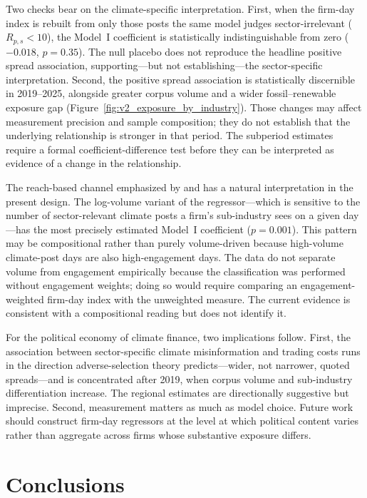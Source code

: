 \documentclass{article}
\theoremstyle{plain}
\begin{document}
Two checks bear on the climate-specific interpretation. First, when the firm-day index is rebuilt from only those posts the same model judges sector-irrelevant ($R_{p,s}<10$), the Model~I coefficient is statistically indistinguishable from zero ($-0.018$, $p=0.35$). The null placebo does not reproduce the headline positive spread association, supporting---but not establishing---the sector-specific interpretation. Second, the positive spread association is statistically discernible in 2019--2025, alongside greater corpus volume and a wider fossil--renewable exposure gap (Figure~\ref{fig:v2_exposure_by_industry}). Those changes may affect measurement precision and sample composition; they do not establish that the underlying relationship is stronger in that period. The subperiod estimates require a formal coefficient-difference test before they can be interpreted as evidence of a change in the relationship.

The reach-based channel emphasized by \textcite{acemoglu2010spread} and \textcite{VosoughiRoyAral2018} has a natural interpretation in the present design. The log-volume variant of the regressor---which is sensitive to the number of sector-relevant climate posts a firm's sub-industry sees on a given day---has the most precisely estimated Model~I coefficient ($p=0.001$). This pattern may be compositional rather than purely volume-driven because high-volume climate-post days are also high-engagement days. The data do not separate volume from engagement empirically because the classification was performed without engagement weights; doing so would require comparing an engagement-weighted firm-day index with the unweighted measure. The current evidence is consistent with a compositional reading but does not identify it.

For the political economy of climate finance, two implications follow. First, the association between sector-specific climate misinformation and trading costs runs in the direction adverse-selection theory predicts---wider, not narrower, quoted spreads---and is concentrated after 2019, when corpus volume and sub-industry differentiation increase. The regional estimates are directionally suggestive but imprecise. Second, measurement matters as much as model choice. Future work should construct firm-day regressors at the level at which political content varies rather than aggregate across firms whose substantive exposure differs.

\section{Conclusions}
\label{sec:conclusion}
\end{document}
